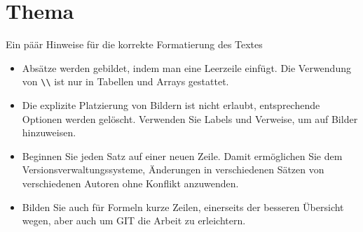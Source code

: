 %
%
%
%
\chapter{Thema\label{chapter:laplace}}
\begin{refsection}

Ein päär Hinweise für die korrekte Formatierung des Textes
\begin{itemize}
\item
Absätze werden gebildet, indem man eine Leerzeile einfügt.
Die Verwendung von \verb+\\+ ist nur in Tabellen und Arrays gestattet.
\item
Die explizite Platzierung von Bildern ist nicht erlaubt, entsprechende
Optionen werden gelöscht. 
Verwenden Sie Labels und Verweise, um auf Bilder hinzuweisen.
\item
Beginnen Sie jeden Satz auf einer neuen Zeile. 
Damit ermöglichen Sie dem Versionsverwaltungssysteme, Änderungen
in verschiedenen Sätzen von verschiedenen Autoren ohne Konflikt 
anzuwenden.
\item 
Bilden Sie auch für Formeln kurze Zeilen, einerseits der besseren
Übersicht wegen, aber auch um GIT die Arbeit zu erleichtern.
\end{itemize}






\printbibliography[heading=subbibliography]
\end{refsection}
